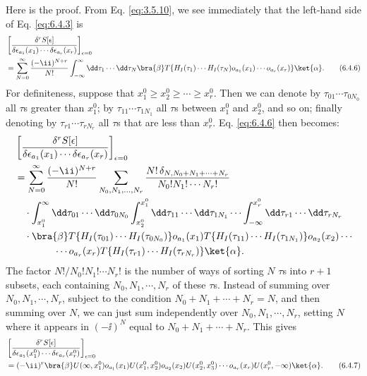 Here is the proof. From Eq. \eqref{eq:3.5.10}, we see immediately that the left-hand
side of Eq. \eqref{eq:6.4.3} is
\begin{align}
&\left[
\frac{\delta^rS[\epsilon]}
{\delta\epsilon_{a_1}(x_1)\cdots\delta\epsilon_{a_r}(x_r)}
\right]_{\epsilon=0}\notag\\
&=\sum_{N=0}^{\infty}\frac{(-\ii)^{N+r}}{N!}
\int_{-\infty}^{\infty}\dd\tau_1\cdots \dd\tau_N
\bra{\beta}T\{H_I(\tau_1)\cdots H_I(\tau_N)
o_{a_1}(x_1)\cdots o_{a_r}(x_r)\}\ket{\alpha}.
\tag{6.4.6}
\label{eq:6.4.6}
\end{align}
For definiteness, suppose that $x_1^0\geq x_2^0\geq\cdots\geq x_r^0$. Then
we can denote by $\tau_{01}\cdots\tau_{0N_0}$ all $\tau$s greater than $x_1^0$;
by $\tau_{11}\cdots\tau_{1N_1}$ all $\tau$s between $x_1^0$ and $x_2^0$, and
so on; finally denoting by $\tau_{r1}\cdots\tau_{rN_r}$ all $\tau$s that are
less than $x_r^0$. Eq. \eqref{eq:6.4.6} then becomes:
\begin{align*}
&\left[
\frac{\delta^rS[\epsilon]}
{\delta\epsilon_{a_1}(x_1)\cdots\delta\epsilon_{a_r}(x_r)}
\right]_{\epsilon=0}\\
&=\sum_{N=0}^{\infty}\frac{(-\ii)^{N+r}}{N!}
\sum_{N_0,N_1,\ldots,N_r}
\frac{N!\,\delta_{N,N_0+N_1+\cdots+N_r}}{N_0!N_1!\cdots N_r!}\\
&\quad\cdot
\int_{x_1^0}^{\infty}\dd\tau_{01}\cdots \dd\tau_{0N_0}
\int_{x_2^0}^{x_1^0}\dd\tau_{11}\cdots \dd\tau_{1N_1}\cdots
\int_{-\infty}^{x_r^0}\dd\tau_{r1}\cdots \dd\tau_{rN_r}\\
&\quad\cdot\bra{\beta}
T\{H_I(\tau_{01})\cdots H_I(\tau_{0N_0})\}o_{a_1}(x_1)
T\{H_I(\tau_{11})\cdots H_I(\tau_{1N_1})\}o_{a_2}(x_2)\cdots\\
&\qquad\qquad{}\cdots o_{a_r}(x_r)
T\{H_I(\tau_{r1})\cdots H_I(\tau_{rN_r})\}\ket{\alpha}.
\end{align*}
The factor $N!/N_0!N_1!\cdots N_r!$ is the number of ways of sorting $N$
$\tau$s into $r+1$ subsets, each containing $N_0,N_1,\cdots,N_r$ of these
$\tau$s. Instead of summing over $N_0,N_1,\cdots,N_r$, subject to the
condition $N_0+N_1+\cdots+N_r=N$, and then summing over $N$, we can just sum
independently over $N_0,N_1,\cdots,N_r$, setting $N$ where it appears in
$(-\ii)^N$ equal to $N_0+N_1+\cdots+N_r$. This gives
\begin{align}
&\left[
\frac{\delta^rS[\epsilon]}
{\delta\epsilon_{a_1}(x_1^0)\cdots\delta\epsilon_{a_r}(x_r^0)}
\right]_{\epsilon=0}\notag\\
&=(-\ii)^r\bra{\beta}U(\infty,x_1^0)o_{a_1}(x_1)
U(x_1^0,x_2^0)o_{a_2}(x_2)U(x_2^0,x_3^0)\cdots
o_{a_r}(x_r)U(x_r^0,-\infty)\ket{\alpha}.
\tag{6.4.7}
\label{eq:6.4.7}
\end{align}
